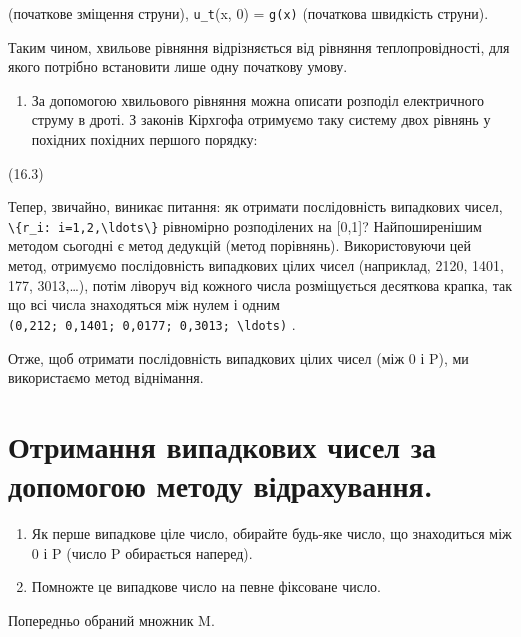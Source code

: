 \documentclass[
  ukrainian,
]{article}
\providecommand{\tightlist}{%
  \setlength{\itemsep}{0pt}\setlength{\parskip}{0pt}}
\begin{document}
(початкове зміщення струни), \texttt{u\_t}(x, 0) = \texttt{g(x)}
(початкова швидкість струни).

Таким чином, хвильове рівняння відрізняється від рівняння
теплопровідності, для якого потрібно встановити лише одну початкову
умову.

\begin{enumerate}
\def\labelenumi{\arabic{enumi}.}
\setcounter{enumi}{3}
\tightlist
\item
  За допомогою хвильового рівняння можна описати розподіл електричного
  струму в дроті. З законів Кірхгофа отримуємо таку систему двох рівнянь
  у похідних похідних першого порядку:
\end{enumerate}

(16.3)

Тепер, звичайно, виникає питання: як отримати послідовність випадкових
чисел,
\texttt{\textbackslash{}\{r\_i:\ i=1,2,\textbackslash{}ldots\textbackslash{}\}}
рівномірно розподілених на {[}0,1{]}? Найпоширенішим методом сьогодні є
метод дедукцій (метод порівнянь). Використовуючи цей метод, отримуємо
послідовність випадкових цілих чисел (наприклад, 2120, 1401, 177,
3013,\ldots), потім ліворуч від кожного числа розміщується десяткова
крапка, так що всі числа знаходяться між нулем і одним
\texttt{(0,212;\ 0,1401;\ 0,0177;\ 0,3013;\ \textbackslash{}ldots)} .

Отже, щоб отримати послідовність випадкових цілих чисел (між 0 і P), ми
використаємо метод віднімання.

\section{Отримання випадкових чисел за допомогою методу
відрахування.}\label{ux43eux442ux440ux438ux43cux430ux43dux43dux44f-ux432ux438ux43fux430ux434ux43aux43eux432ux438ux445-ux447ux438ux441ux435ux43b-ux437ux430-ux434ux43eux43fux43eux43cux43eux433ux43eux44e-ux43cux435ux442ux43eux434ux443-ux432ux456ux434ux440ux430ux445ux443ux432ux430ux43dux43dux44f.}

\begin{enumerate}
\def\labelenumi{\arabic{enumi}.}
\item
  Як перше випадкове ціле число, обирайте будь-яке число, що знаходиться
  між 0 і P (число P обирається наперед).
\item
  Помножте це випадкове число на певне фіксоване число.
\end{enumerate}

Попередньо обраний множник M.
\end{document}
